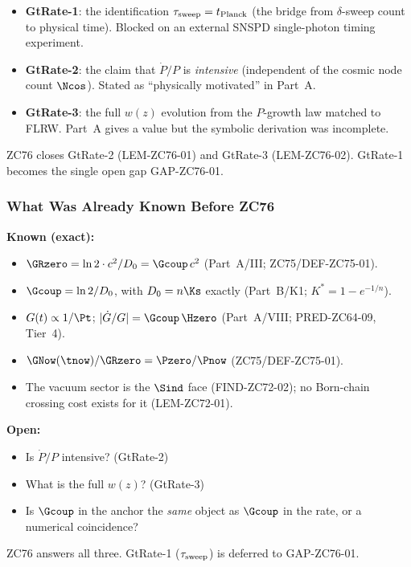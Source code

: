 \documentclass[12pt, a4paper]{article}
\begin{document}
\begin{keybox}[title={The Three GtRate Open Items (Part~A/VIII)}]
\begin{itemize}[leftmargin=2em, noitemsep]
  \item \textbf{GtRate-1}: the identification $\tau_{\rm sweep} =
    t_{\rm Planck}$ (the bridge from $\delta$-sweep count to physical
    time). Blocked on an external SNSPD single-photon timing experiment.
  \item \textbf{GtRate-2}: the claim that $\dot{P}/P$ is
    \emph{intensive} (independent of the cosmic node count
    $\Ncos$). Stated as ``physically motivated'' in Part~A.
  \item \textbf{GtRate-3}: the full $w(z)$ evolution from the
    $P$-growth law matched to FLRW. Part~A gives a value but the
    symbolic derivation was incomplete.
\end{itemize}
ZC76 closes GtRate-2 (LEM-ZC76-01) and GtRate-3 (LEM-ZC76-02).
GtRate-1 becomes the single open gap GAP-ZC76-01.
\end{keybox}

\subsubsection{What Was Already Known Before ZC76}

\begin{keybox}[title={Pre-ZC76 Status of the Cosmological Bridge}]
\textbf{Known (exact):}
\begin{itemize}[leftmargin=2em, noitemsep]
  \item $\GRzero = \ln2\cdot c^2/D_0 = \Gcoup\,c^2$
    (Part~A/III; ZC75/DEF-ZC75-01).
  \item $\Gcoup = \ln2/D_0$, with $D_0 = n\Ks$ exactly
    (Part~B/K1; $K^* = 1-e^{-1/n}$).
  \item $G(t)\propto 1/\Pt$; $|\dot{G}/G| = \Gcoup\,\Hzero$
    (Part~A/VIII; PRED-ZC64-09, Tier~4).
  \item $\GNow(\tnow)/\GRzero = \Pzero/\Pnow$
    (ZC75/DEF-ZC75-01).
  \item The vacuum sector is the $\Sind$ face (FIND-ZC72-02);
    no Born-chain crossing cost exists for it (LEM-ZC72-01).
\end{itemize}

\textbf{Open:}
\begin{itemize}[leftmargin=2em, noitemsep]
  \item Is $\dot{P}/P$ intensive? (GtRate-2)
  \item What is the full $w(z)$? (GtRate-3)
  \item Is $\Gcoup$ in the anchor the \emph{same} object as $\Gcoup$
    in the rate, or a numerical coincidence?
\end{itemize}

ZC76 answers all three. GtRate-1 ($\tau_{\rm sweep}$) is deferred to
GAP-ZC76-01.
\end{keybox}
\end{document}
